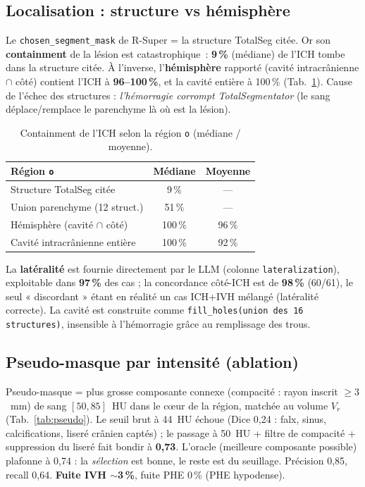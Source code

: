 \documentclass[11pt,a4paper]{article}
\begin{document}
\subsection{Localisation : structure vs hémisphère}
\label{sec:loc}
Le \texttt{chosen\_segment\_mask} de R-Super = la structure TotalSeg citée. Or son
\textbf{containment} de la lésion est catastrophique~: \textbf{9\,\%} (médiane) de l'ICH
tombe dans la structure citée. À l'inverse, l'\textbf{hémisphère} rapporté (cavité
intracrânienne $\cap$ côté) contient l'ICH à \textbf{96--100\,\%}, et la cavité entière
à 100\,\% (Tab.~\ref{tab:containment}). Cause de l'échec des structures : \emph{l'hémorragie
corrompt TotalSegmentator} (le sang déplace/remplace le parenchyme là où est la lésion).

\begin{table}[h]\centering
\caption{Containment de l'ICH selon la région \texttt{o} (médiane / moyenne).}
\label{tab:containment}
\begin{tabular}{lcc}
\toprule
Région \texttt{o} & Médiane & Moyenne \\
\midrule
Structure TotalSeg citée & 9\,\% & --- \\
Union parenchyme (12 struct.) & 51\,\% & --- \\
Hémisphère (cavité $\cap$ côté) & 100\,\% & 96\,\% \\
Cavité intracrânienne entière & 100\,\% & 92\,\% \\
\bottomrule
\end{tabular}
\end{table}

\noindent La \textbf{latéralité} est fournie directement par le LLM (colonne
\texttt{lateralization}), exploitable dans \textbf{97\,\%} des cas ; la concordance
côté-ICH est de \textbf{98\,\%} (60/61), le seul « discordant » étant en réalité un cas
ICH+IVH mélangé (latéralité correcte). La cavité est construite comme
\texttt{fill\_holes(union des 16 structures)}, insensible à l'hémorragie grâce au
remplissage des trous.

\subsection{Pseudo-masque par intensité (ablation)}
\label{sec:pseudo}
Pseudo-masque = plus grosse composante connexe (compacité : rayon inscrit $\geq 3$~mm) de
sang $[50,85]$~HU dans le c\oe ur de la région, matchée au volume $V_r$
(Tab.~\ref{tab:pseudo}). Le seuil brut à 44~HU échoue (Dice 0,24 : falx, sinus,
calcifications, liseré crânien captés) ; le passage à 50~HU + filtre de compacité +
suppression du liseré fait bondir à \textbf{0,73}. L'oracle (meilleure composante possible)
plafonne à 0,74 : la \emph{sélection} est bonne, le reste est du seuillage. Précision 0,85,
recall 0,64. \textbf{Fuite IVH $\sim$3\,\%}, fuite PHE 0\,\% (PHE hypodense).
\end{document}
